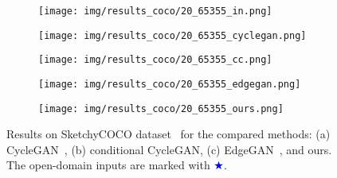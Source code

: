 \documentclass[10pt,twocolumn,letterpaper]{article}
\begin{document}
\begin{figure}[tbp]
\begin{center}
  \begin{subfigure}[b]{\cocowidth\linewidth}
  \texttt{[image: img/results\_coco/20\_65355\_in.png]}
  \end{subfigure}
  \begin{subfigure}[b]{\cocowidth\linewidth}
  \texttt{[image: img/results\_coco/20\_65355\_cyclegan.png]}
  \end{subfigure}
 \begin{subfigure}[b]{\cocowidth\linewidth}
  \texttt{[image: img/results\_coco/20\_65355\_cc.png]}
  \end{subfigure}
\begin{subfigure}[b]{\cocowidth\linewidth}
  \texttt{[image: img/results\_coco/20\_65355\_edgegan.png]}
  \end{subfigure}
  \begin{subfigure}[b]{\cocowidth\linewidth}
  \texttt{[image: img/results\_coco/20\_65355\_ours.png]}
  \end{subfigure}
\end{center}
\caption{Results on SketchyCOCO dataset~\cite{gao2020sketchycoco} for the compared methods: (a) CycleGAN~\cite{zhu2017unpaired}, (b) conditional CycleGAN, (c) EdgeGAN~\cite{gao2020sketchycoco}, and ours. The open-domain inputs are marked with \textcolor{blue}{$\bigstar$}. }\label{fig:sketchycoco_results}
\end{figure}
\end{document}
